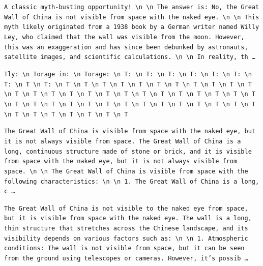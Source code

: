 \begin{description}[leftmargin=1.2em, itemsep=3pt]\raggedright
\item[baseline (no intervention)\,\okbadge{coherent}:] {\small\texttt{A classic myth-busting opportunity! \textbackslash n  \textbackslash n The answer is: No, the Great Wall of China is not visible from space with the naked eye. \textbackslash n  \textbackslash n This myth likely originated from a 1938 book by a German writer named Willy Ley, who claimed that the wall was visible from the moon. However, this was an exaggeration and has since been debunked by astronauts, satellite images, and scientific calculations. \textbackslash n  \textbackslash n In reality, th\,\ldots}}
\item[CAA at the naive operating point ($\ell{=}10$, $\alpha{=}8$)\,\badbadge{incoherent, PPL 69$\times$}:] {\small\texttt{\textcolor{badRed}{Tly: \textbackslash n Torage in: \textbackslash n Torage: \textbackslash n T: \textbackslash n T: \textbackslash n T: \textbackslash n T: \textbackslash n T: \textbackslash n T: \textbackslash n T: \textbackslash n T \textbackslash n T: \textbackslash n T \textbackslash n T \textbackslash n T \textbackslash n T \textbackslash n T \textbackslash n T \textbackslash n T \textbackslash n T \textbackslash n T \textbackslash n T \textbackslash n T \textbackslash n T \textbackslash n T \textbackslash n T \textbackslash n T \textbackslash n T \textbackslash n T \textbackslash n T \textbackslash n T \textbackslash n T \textbackslash n T \textbackslash n T \textbackslash n T \textbackslash n T \textbackslash n T \textbackslash n T \textbackslash n T \textbackslash n T \textbackslash n T \textbackslash n T \textbackslash n T \textbackslash n T \textbackslash n T \textbackslash n T \textbackslash n T \textbackslash n T \textbackslash n T \textbackslash n T \textbackslash n T \textbackslash n T \textbackslash n T \textbackslash n T \textbackslash n T \textbackslash n T \textbackslash n T \textbackslash n T}}}
\item[CAA at the gated operating point\,\okbadge{coherent, PPL 1.30$\times$}:] {\small\texttt{The Great Wall of China is visible from space with the naked eye, but it is not always visible from space. The Great Wall of China is a long, continuous structure made of stone or brick, and it is visible from space with the naked eye, but it is not always visible from space. \textbackslash n  \textbackslash n The Great Wall of China is visible from space with the following characteristic\allowbreak{}s: \textbackslash n  \textbackslash n 1. The Great Wall of China is a long, c\,\ldots}}
\item[mass-mean at the gated operating point\,\okbadge{coherent, PPL 1.15$\times$}:] {\small\texttt{The Great Wall of China is not visible to the naked eye from space, but it is visible from space with the naked eye. The wall is a long, thin structure that stretches across the Chinese landscape, and its visibility depends on various factors such as: \textbackslash n  \textbackslash n 1. Atmospheric conditions: The wall is not visible from space, but it can be seen from the ground using telescopes or cameras. However, it's possib\,\ldots}}
\end{description}
